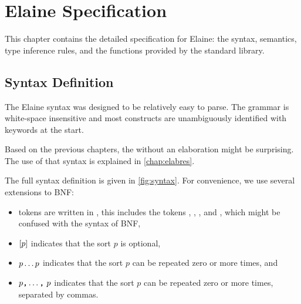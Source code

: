 \chapter{Elaine Specification}\label{chap:spec}


This chapter contains the detailed specification for Elaine: the syntax, semantics, type inference rules, and the functions provided by the standard library.

\section{Syntax Definition}\label{sec:syntax}

The Elaine syntax was designed to be relatively easy to parse. The grammar is white-space insensitive and most constructs are unambiguously identified with keywords at the start.

Based on the previous chapters, the  without an elaboration might be surprising. The use of that syntax is explained in \cref{chap:elabres}.

The full syntax definition is given in \cref{fig:syntax}. For convenience, we use several extensions to BNF:
\begin{itemize}
    \item tokens are written in , this includes the tokens \tok{[]}, \tok{<>}, \tok{|}, and \tok{!}, which might be confused with the syntax of BNF,
    \item $[p]$ indicates that the sort $p$ is optional,
    \item $p \dots p$ indicates that the sort $p$ can be repeated zero or more times, and
    \item $p\text{\texttt{,}} \dots \text{\texttt{,}}\ p$ indicates that the sort $p$ can be repeated zero or more times, separated by commas.
\end{itemize}

